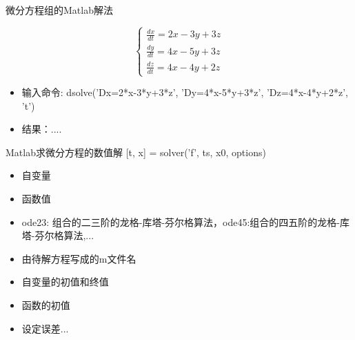 \documentclass[UTF8]{ctexbeamer}
\begin{document}
\begin{frame}{微分方程组的Matlab解法}
  \begin{block}{}
  \[
  \left\{
  \begin{array}{l}
    \frac{dx}{dt}=2x-3y+3z\\
    \frac{dy}{dt}=4x-5y+3z\\
    \frac{dz}{dt}=4x-4y+2z
  \end{array}
  \right.
  \]
  \end{block}

  \begin{itemize}
  \item 输入命令: dsolve('Dx=2*x-3*y+3*z', 'Dy=4*x-5*y+3*z', 'Dz=4*x-4*y+2*z', 't')
  \item 结果：....
  \end{itemize}
  
\end{frame}

\begin{frame}{Matlab求微分方程的数值解}
  [t, x] = solver('f', ts, x0, options)

  \begin{itemize}
  \item [t] 自变量
  \item [x] 函数值
  \item [solver] ode23: 组合的二三阶的龙格-库塔-芬尔格算法，ode45:组合的四五阶的龙格-库塔-芬尔格算法,...
  \item [f] 由待解方程写成的m文件名
  \item [ts] 自变量的初值和终值
  \item [x0] 函数的初值
  \item [options] 设定误差...
  \end{itemize}

\end{frame}
\end{document}
